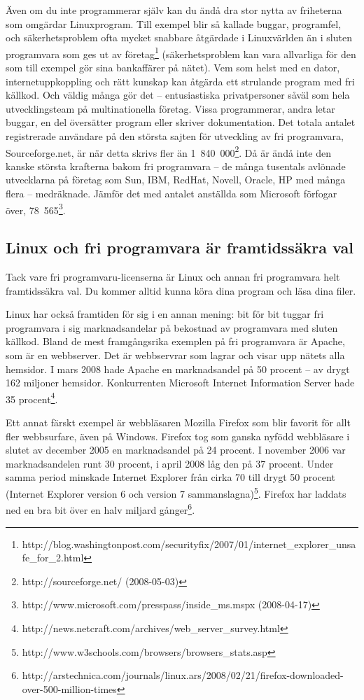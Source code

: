 \documentclass[a4paper,final]{memoir} %
\begin{document}
Även om du inte programmerar själv kan du ändå dra stor nytta av friheterna som omgärdar Linuxprogram. Till exempel blir så kallade buggar, programfel, och säkerhetsproblem ofta mycket snabbare åtgärdade i Linuxvärlden än i sluten programvara som ges ut av företag\footnote{http://blog.washingtonpost.com/securityfix/2007/01/internet\_explorer\_unsafe\_for\_2.html} (säkerhetsproblem kan vara allvarliga för den som till exempel gör sina bankaffärer på nätet). Vem som helst med en dator, internetuppkoppling och rätt kunskap kan åtgärda ett strulande program med fri källkod. Och väldig många gör det -- entusiastiska privatpersoner såväl som hela utvecklingsteam på multinationella företag. Vissa programmerar, andra letar buggar, en del översätter program eller skriver dokumentation. Det totala antalet registrerade användare på den största sajten för utveckling av fri programvara, Sourceforge.net, är när detta skrivs fler än 1~840~000\footnote{http://sourceforge.net/ (2008-05-03)}. Då är ändå inte den kanske största krafterna bakom fri programvara -- de många tusentals avlönade utvecklarna på företag som Sun, IBM, RedHat, Novell, Oracle, HP med många flera -- medräknade. Jämför det med antalet anställda som Microsoft förfogar över, 78~565\footnote{http://www.microsoft.com/presspass/inside\_ms.mspx (2008-04-17)}.


\subsection{Linux och fri programvara är framtidssäkra val}

Tack vare fri programvaru-licenserna är Linux och annan fri programvara helt framtidssäkra val. Du kommer alltid kunna köra dina program och läsa dina filer. 

Linux har också framtiden för sig i en annan mening: bit för bit tuggar fri programvara i sig marknadsandelar på bekostnad av programvara med sluten källkod. Bland de mest framgångsrika exemplen på fri programvara är Apache, som är en webbserver. Det är webbservrar som lagrar och visar upp nätets alla hemsidor. I mars 2008 hade Apache en marknadsandel på 50 procent -- av drygt 162 miljoner hemsidor. Konkurrenten Microsoft Internet Information Server hade 35 procent\footnote{http://news.netcraft.com/archives/web\_server\_survey.html}. 

Ett annat färskt exempel är webbläsaren Mozilla Firefox som blir favorit för allt fler webbsurfare, även på Windows. Firefox tog som ganska nyfödd webbläsare i slutet av december 2005 en marknadsandel på 24 procent. I november 2006 var marknadsandelen runt 30 procent, i april 2008 låg den på 37 procent. Under samma period minskade Internet Explorer från cirka 70 till drygt 50 procent (Internet Explorer version 6 och version 7 sammanslagna)\footnote{http://www.w3schools.com/browsers/browsers\_stats.asp}. Firefox har laddats ned en bra bit över en halv miljard gånger\footnote{http://arstechnica.com/journals/linux.ars/2008/02/21/firefox-downloaded-over-500-million-times}.
\end{document}

